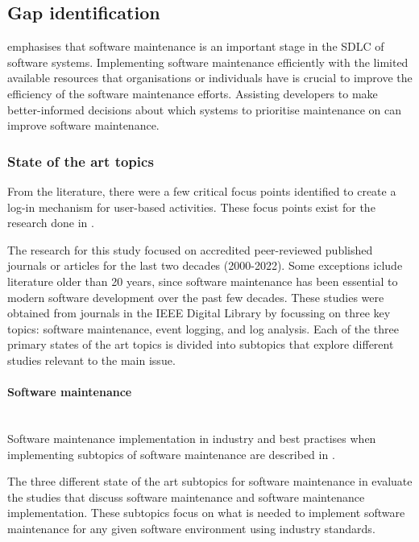 \newcommand{\studyGap}{Implementing software maintenance efficiently with the limited available resources that organisations or individuals have is crucial to improve the efficiency of the software maintenance efforts. Assisting developers to make better-informed decisions about which systems to prioritise maintenance on can improve software maintenance.}

\subsection{Gap identification}\label{sec:ch1_gapIdentification}
 emphasises that software maintenance is an important stage in the SDLC of software systems. \studyGap

\subsubsection{State of the art topics}
From the literature, there were a few critical focus points identified to create a log-in mechanism for user-based activities. These focus points exist for the research done in .\par The research for this study focused on accredited peer-reviewed published journals or articles for the last two decades (2000-2022). Some exceptions iclude literature older than 20 years, since software maintenance has been essential to modern software development over the past few decades. These studies were obtained from journals in the IEEE Digital Library by focussing on three key topics: software maintenance, event logging, and log analysis. Each of the three primary states of the art topics is divided into subtopics that explore different studies relevant to the main issue.

\paragraph{Software maintenance} \leavevmode\\
Software maintenance implementation in industry and best practises when implementing subtopics of software maintenance are described in . \par The three different state of the art subtopics for software maintenance in  evaluate the studies that discuss software maintenance and software maintenance implementation. These subtopics focus on what is needed to implement software maintenance for any given software environment using industry standards.

